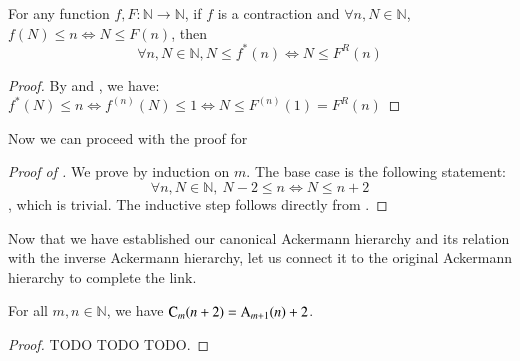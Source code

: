 %
%
%
%

\begin{lem}  \label{lem: countdown_rep_app}
For any function $f, F: \mathbb{N} \to \mathbb{N}$, 
if $f$ is a contraction and $\forall n, N\in \mathbb{N}$, 
$f(N) \le n \iff N \le F(n)$, then
$$ \forall n, N\in \mathbb{N}, N\le f^*(n) \iff N \le F^R(n) $$
\end{lem}

\begin{proof}
By  and , we have:
$\displaystyle f^*(N)\le n \iff f^{(n)}(N) \le 1 \iff N \le F^{(n)}(1) = F^R(n) $
\end{proof}

Now we can proceed with the proof for 

\begin{proof}[Proof of ]
We prove by induction on $m$. The base case is the following statement:
$$ \forall n, N\in \mathbb{N}, \ N - 2\le n \iff N \le n + 2 $$
, which is trivial. The inductive step follows directly from .
\end{proof}

Now that we have established our canonical Ackermann hierarchy 
and its relation with the inverse Ackermann hierarchy, let us 
connect it to the original Ackermann hierarchy to complete the link.

\begin{thm} \label{thm: can_ack_ack}
For all $m, n\in \mathbb{N}$, we have $\text{C}_m(n+2) = \text{A}_{m+1}(n) + 2$.
\end{thm}

\begin{proof} TODO TODO TODO.
%
%
\end{proof}

